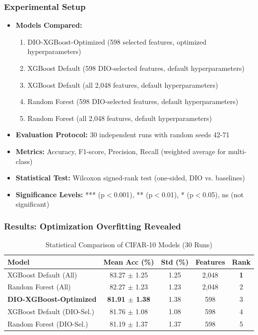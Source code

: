 \documentclass[12pt, a4paper]{article}
\begin{document}
\subsubsection{Experimental Setup}
\begin{itemize}
    \item \textbf{Models Compared:}
    \begin{enumerate}
        \item DIO-XGBoost-Optimized (598 selected features, optimized hyperparameters)
        \item XGBoost Default (598 DIO-selected features, default hyperparameters)
        \item XGBoost Default (all 2,048 features, default hyperparameters)
        \item Random Forest (598 DIO-selected features, default hyperparameters)
        \item Random Forest (all 2,048 features, default hyperparameters)
    \end{enumerate}
    \item \textbf{Evaluation Protocol:} 30 independent runs with random seeds 42-71
    \item \textbf{Metrics:} Accuracy, F1-score, Precision, Recall (weighted average for multi-class)
    \item \textbf{Statistical Test:} Wilcoxon signed-rank test (one-sided, DIO vs. baselines)
    \item \textbf{Significance Levels:} *** (p$<$0.001), ** (p$<$0.01), * (p$<$0.05), ns (not significant)
\end{itemize}

\subsubsection{Results: Optimization Overfitting Revealed}

\begin{table}[H]
    \centering
    \caption{Statistical Comparison of CIFAR-10 Models (30 Runs)}
    \label{tab:cifar_stats}
    \begin{tabular}{lcccc}
        \toprule
        \textbf{Model} & \textbf{Mean Acc (\%)} & \textbf{Std (\%)} & \textbf{Features} & \textbf{Rank} \\
        \midrule
        XGBoost Default (All) & 83.27 $\pm$ 1.25 & 1.25 & 2,048 & \textbf{1} \\
        Random Forest (All) & 82.27 $\pm$ 1.23 & 1.23 & 2,048 & 2 \\
        \textbf{DIO-XGBoost-Optimized} & \textbf{81.91 $\pm$ 1.38} & 1.38 & 598 & 3 \\
        XGBoost Default (DIO-Sel.) & 81.76 $\pm$ 1.08 & 1.08 & 598 & 4 \\
        Random Forest (DIO-Sel.) & 81.19 $\pm$ 1.37 & 1.37 & 598 & 5 \\
        \bottomrule
    \end{tabular}
\end{table}
\end{document}
